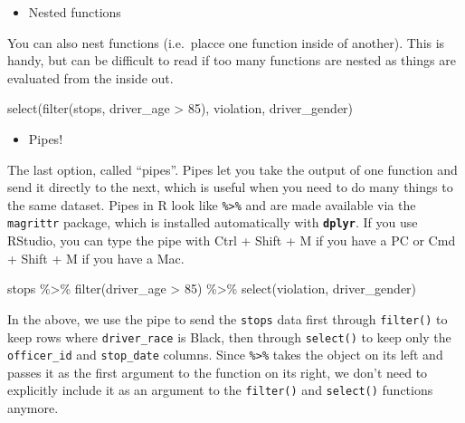 \documentclass[
]{book}
\newenvironment{Shaded}{\begin{snugshade}}{\end{snugshade}}
\newcommand{\DecValTok}[1]{\textcolor[rgb]{0.00,0.00,0.81}{#1}}
\newcommand{\FunctionTok}[1]{\textcolor[rgb]{0.00,0.00,0.00}{#1}}
\newcommand{\NormalTok}[1]{#1}
\newcommand{\SpecialCharTok}[1]{\textcolor[rgb]{0.00,0.00,0.00}{#1}}
\providecommand{\tightlist}{%
  \setlength{\itemsep}{0pt}\setlength{\parskip}{0pt}}
\begin{document}
\begin{itemize}
\tightlist
\item
  Nested functions
\end{itemize}

You can also nest functions (i.e.~placce one function inside of another).
This is handy, but can be difficult to read if too many functions are nested as things are evaluated from the inside out.

\begin{Shaded}
\begin{Highlighting}[]
\FunctionTok{select}\NormalTok{(}\FunctionTok{filter}\NormalTok{(stops, driver\_age }\SpecialCharTok{\textgreater{}} \DecValTok{85}\NormalTok{), violation, driver\_gender)}
\end{Highlighting}
\end{Shaded}

\begin{itemize}
\tightlist
\item
  Pipes!
\end{itemize}

The last option, called ``pipes''. Pipes let you take
the output of one function and send it directly to the next, which is useful
when you need to do many things to the same dataset. Pipes in R look like
\texttt{\%\textgreater{}\%} and are made available via the \texttt{magrittr} package, which is installed automatically with \textbf{\texttt{dplyr}}. If you use RStudio, you can type the pipe with Ctrl
+ Shift + M if you have a PC or Cmd +
Shift + M if you have a Mac.

\begin{Shaded}
\begin{Highlighting}[]
\NormalTok{stops }\SpecialCharTok{\%\textgreater{}\%}
  \FunctionTok{filter}\NormalTok{(driver\_age }\SpecialCharTok{\textgreater{}} \DecValTok{85}\NormalTok{) }\SpecialCharTok{\%\textgreater{}\%}
  \FunctionTok{select}\NormalTok{(violation, driver\_gender)}
\end{Highlighting}
\end{Shaded}

In the above, we use the pipe to send the \texttt{stops} data first through
\texttt{filter()} to keep rows where \texttt{driver\_race} is Black, then through \texttt{select()}
to keep only the \texttt{officer\_id} and \texttt{stop\_date} columns. Since \texttt{\%\textgreater{}\%} takes
the object on its left and passes it as the first argument to the function on
its right, we don't need to explicitly include it as an argument to the
\texttt{filter()} and \texttt{select()} functions anymore.
\end{document}
